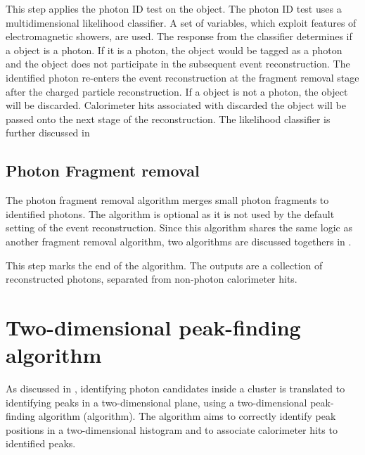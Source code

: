 This step applies the photon ID test on the \ShowerPeak object. The photon ID test uses  a multidimensional likelihood classifier. A set of variables, which exploit features of electromagnetic showers, are used. The response from the classifier determines if a \ShowerPeak object is a photon. If it is a photon, the \ShowerPeak object would be tagged as a photon and the \ShowerPeak object  does not participate in the subsequent event reconstruction. The identified photon re-enters the event reconstruction at the fragment removal stage after the charged particle reconstruction. If a \ShowerPeak object  is not a photon, the \ShowerPeak object  will be discarded. Calorimeter hits associated with discarded the \ShowerPeak object will be passed onto the next stage of the reconstruction. The likelihood classifier is further discussed in 

\subsection{Photon Fragment removal}
\label{sec:photonRecoFragRemoval}

The  photon fragment removal algorithm merges small photon fragments to identified photons. The algorithm is optional as it is not used by the default setting of the event reconstruction. Since this algorithm shares the same logic as another fragment removal algorithm, two algorithms are discussed togethers in .


This step marks the end of the \PhotonReconstruction algorithm. The outputs are a collection of reconstructed photons, separated from non-photon calorimeter hits.

\section{Two-dimensional peak-finding algorithm}
\label{sec:peakFinding}

As discussed in , identifying photon candidates inside a cluster is translated to identifying peaks in a two-dimensional plane, using a two-dimensional peak-finding algorithm (\peakFinding algorithm). The \peakFinding algorithm aims to correctly identify peak positions in a two-dimensional histogram and to associate calorimeter hits to identified peaks.

